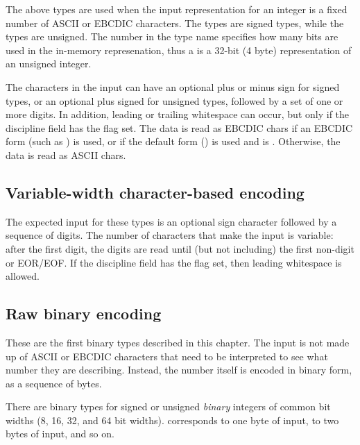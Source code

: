 The above types are used when the input representation for an integer
is a fixed number of ASCII or EBCDIC characters.  The  types are
signed types, while the  types are unsigned.  The number in the
type name specifies how many bits are used in the in-memory
represenation, thus a  is a 32-bit (4 byte) representation of
an unsigned integer.

The characters in the input can have an optional plus or minus sign for
signed types, or an optional plus signed for unsigned types, followed
by a set of one or more digits.   In addition, leading or
trailing whitespace can occur, but only if the \pads{} discipline field
 has the  flag set.
The data is read as EBCDIC chars if an EBCDIC
form (such as ) is used, or if the default form () is used and
 is .  Otherwise, the data is
read as ASCII chars.

\subsection{Variable-width character-based encoding}

\aedBegin{}
\aedEnd{}

The expected input for these types is an optional sign character
followed by a sequence of digits.  The number of characters that make
the input is variable: after the first digit, the digits are read
until (but not including) the first non-digit or EOR/EOF.
If the \pads{} discipline field
 has the  flag set, then
leading whitespace is allowed.

\subsection{Raw binary encoding}

\bBegin{}
\bEnd{}

These are the first binary types described in this chapter. The input
is not made up of ASCII or EBCDIC characters that need to be interpreted
to see what number they are describing.  Instead, the number itself is
encoded in binary form, as a sequence of bytes.  

There are binary types for signed or unsigned {\em binary\/} integers
of common bit widths (8, 16, 32, and 64 bit widths).   corresponds
to one byte of input,  to two bytes of input, and so on.

